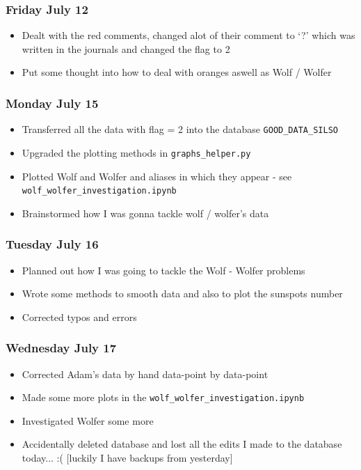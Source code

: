 \documentclass[12pt]{article}
\begin{document}
\subsubsection{Friday July 12}
\begin{itemize}
    \item Dealt with the red comments, changed alot of their comment to `?' which was written in the journals and changed the flag to 2
    \item Put some thought into how to deal with oranges aswell as Wolf / Wolfer
\end{itemize}

\subsubsection{Monday July 15}
\begin{itemize}
    \item Transferred all the data with flag = 2 into the database \texttt{GOOD\_DATA\_SILSO}
    \item Upgraded the plotting methods in \texttt{graphs\_helper.py}
    \item Plotted Wolf and Wolfer and aliases in which they appear - see \texttt{wolf\_wolfer\_investigation.ipynb}
    \item Brainstormed how I was gonna tackle wolf / wolfer's data
\end{itemize}

\subsubsection{Tuesday July 16}
\begin{itemize}
    \item Planned out how I was going to tackle the Wolf - Wolfer problems
    \item Wrote some methods to smooth data and also to plot the sunspots number
    \item Corrected typos and errors
\end{itemize}

\subsubsection{Wednesday July 17}
\begin{itemize}
    \item Corrected Adam's data by hand data-point by data-point
    \item Made some more plots in the \texttt{wolf\_wolfer\_investigation.ipynb}
    \item Investigated Wolfer some more
    \item Accidentally deleted database and lost all the edits I made to the database today... :(  [luckily I have backups from yesterday]
\end{itemize}
\end{document}
